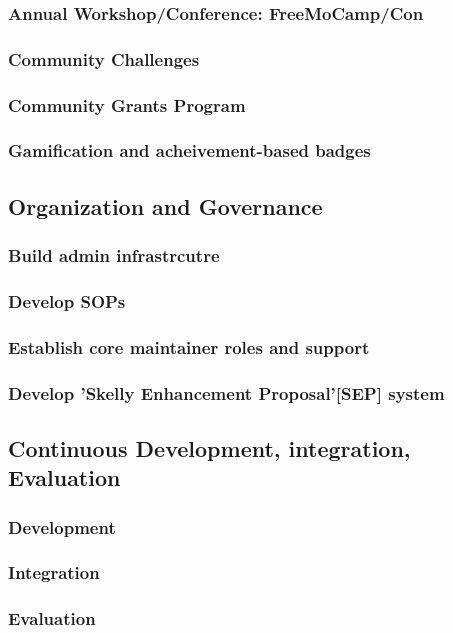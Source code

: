 \documentclass[11pt]{article}
\begin{document}
\subsubsection{Annual Workshop/Conference: FreeMoCamp/Con}
\subsubsection{Community Challenges}
\subsubsection{Community Grants Program}
\subsubsection{Gamification and acheivement-based badges}

\subsection{Organization and Governance}
\subsubsection{Build admin infrastrcutre}
\subsubsection{Develop SOPs}
\subsubsection{Establish core maintainer roles and support}
\subsubsection{Develop 'Skelly Enhancement Proposal'[SEP] system}

\subsection{Continuous Development, integration, Evaluation}
\subsubsection{Development}
\subsubsection{Integration}
\subsubsection{Evaluation}
\end{document}
